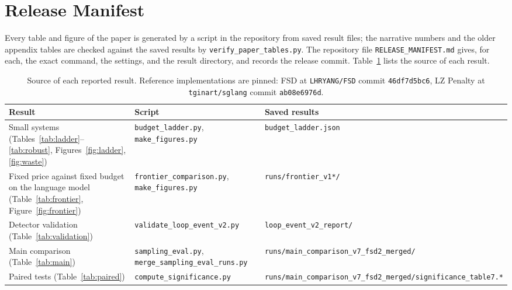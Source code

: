 \section{Release Manifest}
\label{sec:reproducibility}

Every table and figure of the paper is generated by a script in the repository from saved result files; the narrative numbers and the older appendix tables are checked against the saved results by \texttt{verify\_\allowbreak{}paper\_\allowbreak{}tables.py}. The repository file \texttt{RELEASE\_\allowbreak{}MANIFEST.md} gives, for each, the exact command, the settings, and the result directory, and records the release commit. Table~\ref{tab:manifest} lists the source of each result.

\begin{table}[H]
\centering
\caption{Source of each reported result. Reference implementations are pinned: FSD at \texttt{LHRYANG/FSD} commit \texttt{46df7d5bc6}, LZ Penalty at \texttt{tginart/sglang} commit \texttt{ab08e6976d}.}
\label{tab:manifest}
\footnotesize
\begin{tabular}{@{}p{}p{}p{}@{}}
\toprule
Result & Script & Saved results \\
\midrule
Small systems (Tables~\ref{tab:ladder}--\ref{tab:robust}, Figures~\ref{fig:ladder}, \ref{fig:waste}) & \texttt{budget\_\allowbreak{}ladder.py}, \texttt{make\_\allowbreak{}figures.py} & \texttt{budget\_\allowbreak{}ladder.json} \\
Fixed price against fixed budget on the language model (Table~\ref{tab:frontier}, Figure~\ref{fig:frontier}) & \texttt{frontier\_\allowbreak{}comparison.py}, \texttt{make\_\allowbreak{}figures.py} & \texttt{runs/frontier\_\allowbreak{}v1*/} \\
Detector validation (Table~\ref{tab:validation}) & \texttt{validate\_\allowbreak{}loop\_\allowbreak{}event\_\allowbreak{}v2.py} & \texttt{loop\_\allowbreak{}event\_\allowbreak{}v2\_\allowbreak{}report/} \\
Main comparison (Table~\ref{tab:main}) & \texttt{sampling\_\allowbreak{}eval.py}, \texttt{merge\_\allowbreak{}sampling\_\allowbreak{}eval\_\allowbreak{}runs.py} & \texttt{runs/main\_\allowbreak{}comparison\_\allowbreak{}v7\_\allowbreak{}fsd2\_\allowbreak{}merged/} \\
Paired tests (Table~\ref{tab:paired}) & \texttt{compute\_\allowbreak{}significance.py} & \texttt{runs/main\_\allowbreak{}comparison\_\allowbreak{}v7\_\allowbreak{}fsd2\_\allowbreak{}merged/significance\_\allowbreak{}table7.*} \\

\end{tabular}
\end{table}
